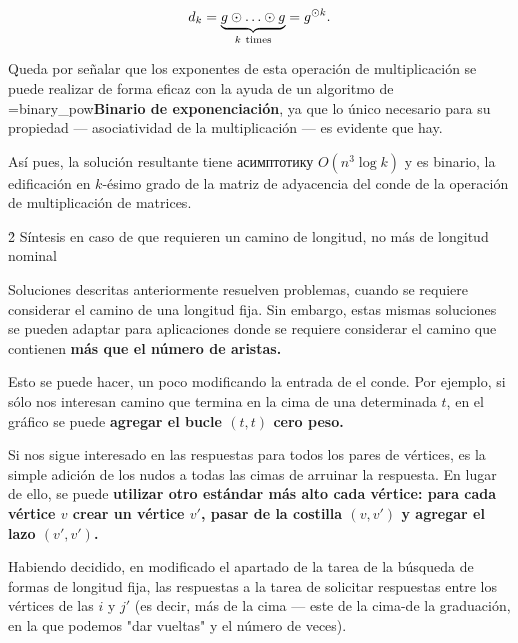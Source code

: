 $$ d_k = \underbrace{ g \odot \ldots \odot g}_{k\ {\rm times}} = g^{\odot k}. $$

Queda por señalar que los exponentes de esta operación de multiplicación se puede realizar de forma eficaz con la ayuda de un algoritmo de \algohref=binary_pow{\bf{Binario de exponenciación}}, ya que lo único necesario para su propiedad --- asociatividad de la multiplicación --- es evidente que hay.

Así pues, la solución resultante tiene асимптотику $O (n^3 \log k)$ y es binario, la edificación en $k$-ésimo grado de la matriz de adyacencia del conde de la operación de multiplicación de matrices.


\h2{ Síntesis en caso de que requieren un camino de longitud, no más de longitud nominal }

Soluciones descritas anteriormente resuelven problemas, cuando se requiere considerar el camino de una longitud fija. Sin embargo, estas mismas soluciones se pueden adaptar para aplicaciones donde se requiere considerar el camino que contienen \bf{más} que el número de aristas.

Esto se puede hacer, un poco modificando la entrada de el conde. Por ejemplo, si sólo nos interesan camino que termina en la cima de una determinada $t$, en el gráfico se puede \bf{agregar el bucle} $(t,t)$ cero peso.

Si nos sigue interesado en las respuestas para todos los pares de vértices, es la simple adición de los nudos a todas las cimas de arruinar la respuesta. En lugar de ello, se puede \bf{utilizar otro estándar más alto} cada vértice: para cada vértice $v$ crear un vértice $v'$, pasar de la costilla $(v,v')$ y agregar el lazo $(v',v')$.

Habiendo decidido, en modificado el apartado de la tarea de la búsqueda de formas de longitud fija, las respuestas a la tarea de solicitar respuestas entre los vértices de las $i$ y $j'$ (es decir, más de la cima --- este de la cima-de la graduación, en la que podemos "dar vueltas" y el número de veces).


